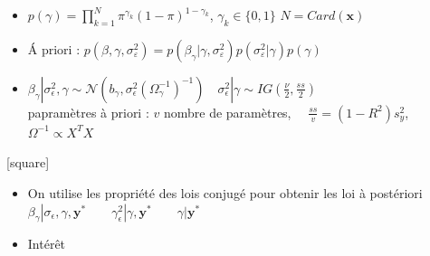 \documentclass{presentation_template}
\begin{document}
\begin{frame}
        \begin{itemize}
            \item  $\displaystyle p(\gamma)=\prod_{k=1}^{N} \pi^{\gamma_k}(1-\pi)^{1-\gamma_k}$, $\gamma_k \in \{0,1 \}$ {\small $N = Card(\mathbf{x})$} 
            \item \'A priori : $p\left(\beta, \gamma, \sigma_{\varepsilon}^{2}\right)=p\left(\beta_{\gamma} | \gamma, \sigma_{\varepsilon}^{2}\right) p\left(\sigma_{\varepsilon}^{2} | \gamma\right) p(\gamma)$ 
            \item $
                \beta_{\gamma}\left|\sigma_{\epsilon}^{2}, \gamma \sim \mathcal{N}\left(b_{\gamma},
                \sigma_{\epsilon}^{2}\left(\Omega_{\gamma}^{-1}\right)^{-1}\right) \quad \sigma_{\epsilon}^{2}\right| \gamma \sim IG\left(\frac{\nu}{2}, \frac{s s}{2}\right)
                $ \\ \vspace{0.2cm}
                {\centering \tiny
                papramètres à priori : $v$ nombre de paramètres,$\quad$ $\frac{s s}{v}=\left(1-R^{2}\right) s_{y}^{2}$, $\quad$         $\Omega^{-1} \propto X^{T} X$ }
        \end{itemize}
    
        [square]
   
    \begin{itemize}
        
        \item On utilise les propriété des lois conjugé pour obtenir les loi à postériori \\ \vspace{0.1cm}
        {\centering
        $\beta_{\gamma} | \sigma_{\epsilon}, \gamma, \mathbf{y}^{*} \quad \quad \gamma_\epsilon^{2} | \gamma, \mathbf{y}^{*} \quad \quad \gamma | \mathbf{y}^{*}$}
        \item Intérêt 
    \end{itemize}

\end{frame}
\end{document}
